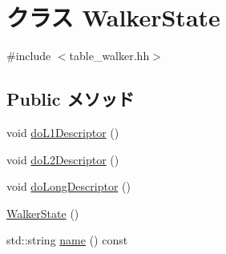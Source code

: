 \hypertarget{classArmISA_1_1TableWalker_1_1WalkerState}{
\section{クラス WalkerState}
\label{classArmISA_1_1TableWalker_1_1WalkerState}
}


{\ttfamily \#include $<$table\_\-walker.hh$>$}\subsection*{Public メソッド}
\begin{DoxyCompactItemize}
\item 
void \hyperlink{classArmISA_1_1TableWalker_1_1WalkerState_a837a539f5e07e8785902d5854efde98d}{doL1Descriptor} ()
\item 
void \hyperlink{classArmISA_1_1TableWalker_1_1WalkerState_a45b9877779ac070b7779f7e1eccdd05e}{doL2Descriptor} ()
\item 
void \hyperlink{classArmISA_1_1TableWalker_1_1WalkerState_abba315db7bc859eeb10035be0dcc1168}{doLongDescriptor} ()
\item 
\hyperlink{classArmISA_1_1TableWalker_1_1WalkerState_a380b5d6cc75b764dc369abc26aa867ee}{WalkerState} ()
\item 
std::string \hyperlink{classArmISA_1_1TableWalker_1_1WalkerState_a37627d5d5bba7f4a8690c71c2ab3cb07}{name} () const 
\end{DoxyCompactItemize}
